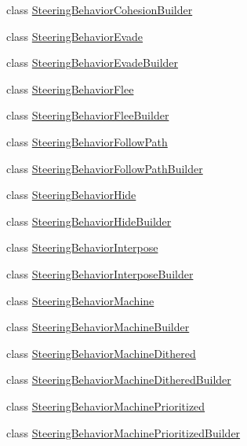 \begin{DoxyCompactItemize}
class \mbox{\hyperlink{classnjli_1_1_steering_behavior_cohesion_builder}{Steering\+Behavior\+Cohesion\+Builder}}
\item 
class \mbox{\hyperlink{classnjli_1_1_steering_behavior_evade}{Steering\+Behavior\+Evade}}
\item 
class \mbox{\hyperlink{classnjli_1_1_steering_behavior_evade_builder}{Steering\+Behavior\+Evade\+Builder}}
\item 
class \mbox{\hyperlink{classnjli_1_1_steering_behavior_flee}{Steering\+Behavior\+Flee}}
\item 
class \mbox{\hyperlink{classnjli_1_1_steering_behavior_flee_builder}{Steering\+Behavior\+Flee\+Builder}}
\item 
class \mbox{\hyperlink{classnjli_1_1_steering_behavior_follow_path}{Steering\+Behavior\+Follow\+Path}}
\item 
class \mbox{\hyperlink{classnjli_1_1_steering_behavior_follow_path_builder}{Steering\+Behavior\+Follow\+Path\+Builder}}
\item 
class \mbox{\hyperlink{classnjli_1_1_steering_behavior_hide}{Steering\+Behavior\+Hide}}
\item 
class \mbox{\hyperlink{classnjli_1_1_steering_behavior_hide_builder}{Steering\+Behavior\+Hide\+Builder}}
\item 
class \mbox{\hyperlink{classnjli_1_1_steering_behavior_interpose}{Steering\+Behavior\+Interpose}}
\item 
class \mbox{\hyperlink{classnjli_1_1_steering_behavior_interpose_builder}{Steering\+Behavior\+Interpose\+Builder}}
\item 
class \mbox{\hyperlink{classnjli_1_1_steering_behavior_machine}{Steering\+Behavior\+Machine}}
\item 
class \mbox{\hyperlink{classnjli_1_1_steering_behavior_machine_builder}{Steering\+Behavior\+Machine\+Builder}}
\item 
class \mbox{\hyperlink{classnjli_1_1_steering_behavior_machine_dithered}{Steering\+Behavior\+Machine\+Dithered}}
\item 
class \mbox{\hyperlink{classnjli_1_1_steering_behavior_machine_dithered_builder}{Steering\+Behavior\+Machine\+Dithered\+Builder}}
\item 
class \mbox{\hyperlink{classnjli_1_1_steering_behavior_machine_prioritized}{Steering\+Behavior\+Machine\+Prioritized}}
\item 
class \mbox{\hyperlink{classnjli_1_1_steering_behavior_machine_prioritized_builder}{Steering\+Behavior\+Machine\+Prioritized\+Builder}}
\item 

\end{DoxyCompactItemize}
